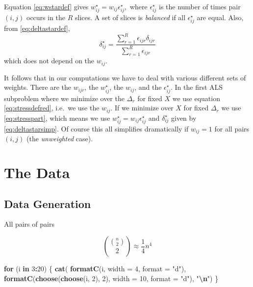 \documentclass[
  12pt,
]{article}
\newenvironment{Shaded}{\begin{snugshade}}{\end{snugshade}}
\newcommand{\AttributeTok}[1]{\textcolor[rgb]{0.13,0.29,0.53}{#1}}
\newcommand{\ControlFlowTok}[1]{\textcolor[rgb]{0.13,0.29,0.53}{\textbf{#1}}}
\newcommand{\DecValTok}[1]{\textcolor[rgb]{0.00,0.00,0.81}{#1}}
\newcommand{\FunctionTok}[1]{\textcolor[rgb]{0.13,0.29,0.53}{\textbf{#1}}}
\newcommand{\NormalTok}[1]{#1}
\newcommand{\SpecialCharTok}[1]{\textcolor[rgb]{0.81,0.36,0.00}{\textbf{#1}}}
\newcommand{\StringTok}[1]{\textcolor[rgb]{0.31,0.60,0.02}{#1}}
\begin{document}
Equation \eqref{eq:wstardef} gives \(w_{ij}^\star=w_{ij}\epsilon_{ij}^\star,\)
where \(\epsilon_{ij}^\star\) is the number of times pair \((i,j)\) occurs in
the \(R\) slices. A set of slices is \emph{balanced} if all \(\epsilon_{ij}^\star\) are equal. Also, from \eqref{eq:deltastardef},
\begin{equation}
\delta_{ij}^\star=\frac{\sum_{r=1}^R \epsilon_{ijr}\delta_{ijr}}{\sum_{r=1}^R \epsilon_{ijr}}
\label{eq:deltastarsimp}
\end{equation}
which does not depend on the \(w_{ij}\).

It follows that in our computations we have to deal with various
different sets of weights. There are the \(w_{ijr}\), the \(w_{ij}^\star\),
the \(w_{ij}\), and the \(\epsilon_{ij}^\star\). In the first ALS subproblem
where we minimize over the \(\Delta_r\) for fixed \(X\) we use
equation \eqref{eq:stressdefred}, i.e.~we use the \(w_{ij}\). If we minimize over \(X\) for fixed \(\Delta_r\) we use \eqref{eq:stresspart}, which means we
use \(w_{ij}^\star=w_{ij}\epsilon_{ij}^\star\) and \(\delta_{ij}^\star\)
given by \eqref{eq:deltastarsimp}. Of course this all simplifies dramatically
if \(w_{ij}=1\) for all pairs \((i,j)\) (the \emph{unweighted} case).

\section{The Data}\label{the-data}

\subsection{Data Generation}\label{data-generation}

All pairs of pairs

\[\binom{\binom{n}{2}}{2}\approx\frac14 n^4\]

\begin{Shaded}
\begin{Highlighting}[]
\ControlFlowTok{for}\NormalTok{ (i }\ControlFlowTok{in} \DecValTok{3}\SpecialCharTok{:}\DecValTok{20}\NormalTok{) \{}
  \FunctionTok{cat}\NormalTok{(}
    \FunctionTok{formatC}\NormalTok{(i, }\AttributeTok{width =} \DecValTok{4}\NormalTok{, }\AttributeTok{format =} \StringTok{"d"}\NormalTok{),}
    \FunctionTok{formatC}\NormalTok{(}\FunctionTok{choose}\NormalTok{(}\FunctionTok{choose}\NormalTok{(i, }\DecValTok{2}\NormalTok{), }\DecValTok{2}\NormalTok{), }\AttributeTok{width =} \DecValTok{10}\NormalTok{, }\AttributeTok{format =} \StringTok{"d"}\NormalTok{),}
    \StringTok{"}\SpecialCharTok{\textbackslash{}n}\StringTok{"}\NormalTok{)}
\NormalTok{\}}
\end{Highlighting}
\end{Shaded}
\end{document}
